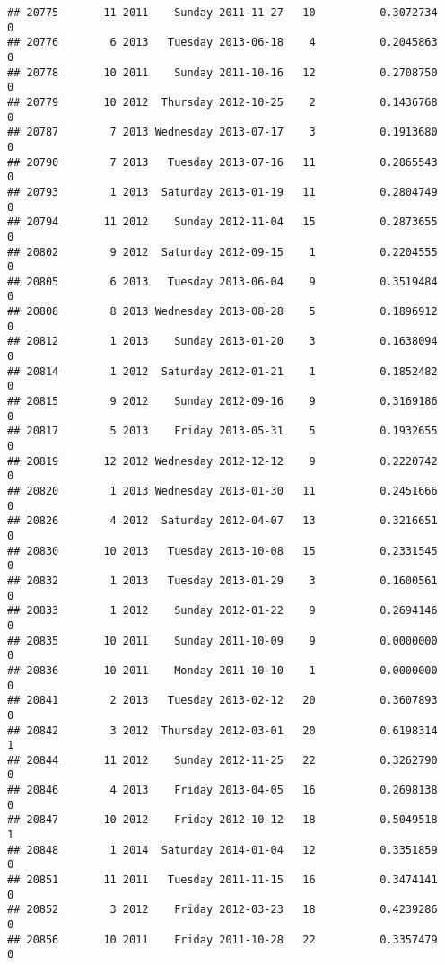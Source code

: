 \documentclass[
]{article}
\begin{document}
\begin{verbatim}
## 20775       11 2011    Sunday 2011-11-27   10          0.3072734             0
## 20776        6 2013   Tuesday 2013-06-18    4          0.2045863             0
## 20778       10 2011    Sunday 2011-10-16   12          0.2708750             0
## 20779       10 2012  Thursday 2012-10-25    2          0.1436768             0
## 20787        7 2013 Wednesday 2013-07-17    3          0.1913680             0
## 20790        7 2013   Tuesday 2013-07-16   11          0.2865543             0
## 20793        1 2013  Saturday 2013-01-19   11          0.2804749             0
## 20794       11 2012    Sunday 2012-11-04   15          0.2873655             0
## 20802        9 2012  Saturday 2012-09-15    1          0.2204555             0
## 20805        6 2013   Tuesday 2013-06-04    9          0.3519484             0
## 20808        8 2013 Wednesday 2013-08-28    5          0.1896912             0
## 20812        1 2013    Sunday 2013-01-20    3          0.1638094             0
## 20814        1 2012  Saturday 2012-01-21    1          0.1852482             0
## 20815        9 2012    Sunday 2012-09-16    9          0.3169186             0
## 20817        5 2013    Friday 2013-05-31    5          0.1932655             0
## 20819       12 2012 Wednesday 2012-12-12    9          0.2220742             0
## 20820        1 2013 Wednesday 2013-01-30   11          0.2451666             0
## 20826        4 2012  Saturday 2012-04-07   13          0.3216651             0
## 20830       10 2013   Tuesday 2013-10-08   15          0.2331545             0
## 20832        1 2013   Tuesday 2013-01-29    3          0.1600561             0
## 20833        1 2012    Sunday 2012-01-22    9          0.2694146             0
## 20835       10 2011    Sunday 2011-10-09    9          0.0000000             0
## 20836       10 2011    Monday 2011-10-10    1          0.0000000             0
## 20841        2 2013   Tuesday 2013-02-12   20          0.3607893             0
## 20842        3 2012  Thursday 2012-03-01   20          0.6198314             1
## 20844       11 2012    Sunday 2012-11-25   22          0.3262790             0
## 20846        4 2013    Friday 2013-04-05   16          0.2698138             0
## 20847       10 2012    Friday 2012-10-12   18          0.5049518             1
## 20848        1 2014  Saturday 2014-01-04   12          0.3351859             0
## 20851       11 2011   Tuesday 2011-11-15   16          0.3474141             0
## 20852        3 2012    Friday 2012-03-23   18          0.4239286             0
## 20856       10 2011    Friday 2011-10-28   22          0.3357479             0

\end{verbatim}
\end{document}
